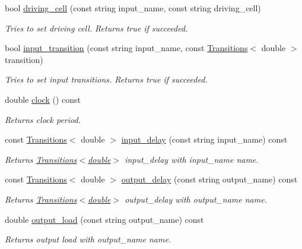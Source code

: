 \begin{DoxyCompactItemize}
bool \hyperlink{classDesign__Constraints_a54c18f5ebd9dbcdc9d3ab8f2d363fc04}{driving\-\_\-cell} (const string input\-\_\-name, const string driving\-\_\-cell)
\begin{DoxyCompactList}\small\item\em Tries to set driving cell. Returns true if succeeded. \end{DoxyCompactList}\item 
bool \hyperlink{classDesign__Constraints_afd86c8844a5a62d1a6bbd7138d548cf9}{input\-\_\-transition} (const string input\-\_\-name, const \hyperlink{classTransitions}{Transitions}$<$ double $>$ transition)
\begin{DoxyCompactList}\small\item\em Tries to set input transitions. Returns true if succeeded. \end{DoxyCompactList}\item 
double \hyperlink{classDesign__Constraints_a535cc6d955b52c959b566510c1e3544a}{clock} () const 
\begin{DoxyCompactList}\small\item\em Returns clock period. \end{DoxyCompactList}\item 
const \hyperlink{classTransitions}{Transitions}$<$ double $>$ \hyperlink{classDesign__Constraints_ae67988a0cd0ba0ab5ad1463c273eb287}{input\-\_\-delay} (const string input\-\_\-name) const 
\begin{DoxyCompactList}\small\item\em Returns \hyperlink{classTransitions}{Transitions$<$double$>$} input\-\_\-delay with input\-\_\-name name. \end{DoxyCompactList}\item 
const \hyperlink{classTransitions}{Transitions}$<$ double $>$ \hyperlink{classDesign__Constraints_a07810050c6ae8a62d1e77ee23ad1f660}{output\-\_\-delay} (const string output\-\_\-name) const 
\begin{DoxyCompactList}\small\item\em Returns \hyperlink{classTransitions}{Transitions$<$double$>$} output\-\_\-delay with output\-\_\-name name. \end{DoxyCompactList}\item 
double \hyperlink{classDesign__Constraints_ab21387336a70852447a1d16e11358840}{output\-\_\-load} (const string output\-\_\-name) const 
\begin{DoxyCompactList}\small\item\em Returns output load with output\-\_\-name name. \end{DoxyCompactList}\item 

\end{DoxyCompactItemize}
